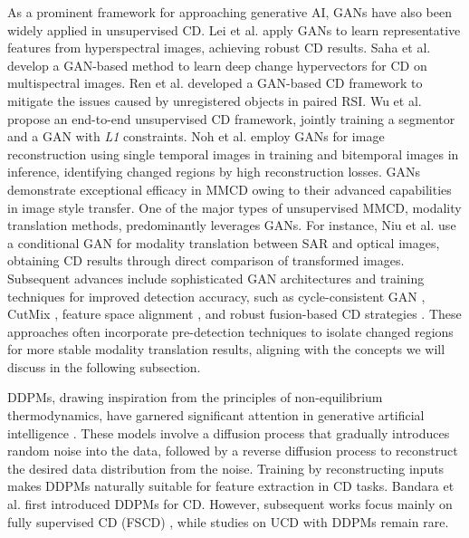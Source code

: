 \par As a prominent framework for approaching generative AI, GANs have also been widely applied in unsupervised CD. Lei et al. \cite{Lei2021Spectral} apply GANs to learn representative features from hyperspectral images, achieving robust CD results. Saha et al. \cite{Saha2021Unsupervised} develop a GAN-based method to learn deep change hypervectors for CD on multispectral images. Ren et al. \cite{Ren2021Unsupervised} developed a GAN-based CD framework to mitigate the issues caused by unregistered objects in paired RSI. Wu et al. \cite{wu2023fully} propose an end-to-end unsupervised CD framework, jointly training a segmentor and a GAN with \textit{L1} constraints. Noh et al. \cite{noh2022unsupervised} employ GANs for image reconstruction using single temporal images in training and bitemporal images in inference, identifying changed regions by high reconstruction losses. GANs demonstrate exceptional efficacy in MMCD owing to their advanced capabilities in image style transfer. One of the major types of unsupervised MMCD, modality translation methods, predominantly leverages GANs. For instance, Niu et al. \cite{Niu2019Conditional} use a conditional GAN for modality translation between SAR and optical images, obtaining CD results through direct comparison of transformed images. Subsequent advances include sophisticated GAN architectures and training techniques for improved detection accuracy, such as cycle-consistent GAN \cite{Luppino2022Deep,Liu2022Unsupervised}, CutMix \cite{Anamaria2022Generative}, feature space alignment \cite{Luppino2024Code}, and robust fusion-based CD strategies \cite{WangCD2024}. These approaches often incorporate pre-detection techniques to isolate changed regions for more stable modality translation results, aligning with the concepts we will discuss in the following subsection.

\par DDPMs, drawing inspiration from the principles of non-equilibrium thermodynamics, have garnered significant attention in generative artificial intelligence \cite{Jonathan2020Denoising}. These models involve a diffusion process that gradually introduces random noise into the data, followed by a reverse diffusion process to reconstruct the desired data distribution from the noise. Training by reconstructing inputs makes DDPMs naturally suitable for feature extraction in CD tasks. Bandara et al. \cite{bandara2024ddpmcd} first introduced DDPMs for CD. However, subsequent works focus mainly on fully supervised CD (FSCD) \cite{Wen2024GCD}, while studies on UCD with DDPMs remain rare.


